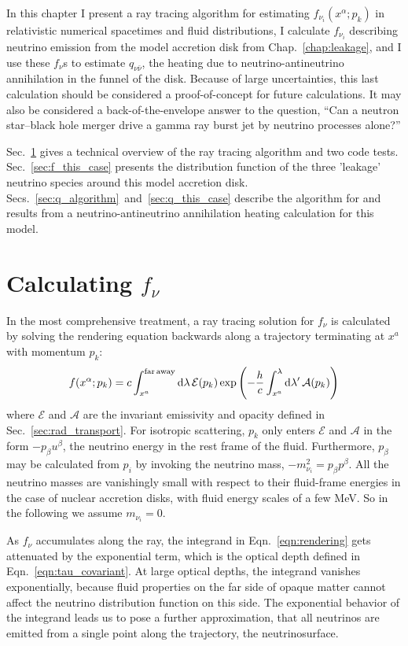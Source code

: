 In this chapter I present a ray tracing algorithm for estimating
$f_{\nu_i}(x^\alpha;p_k)$ in relativistic numerical spacetimes and fluid
distributions, I calculate $f_{\nu_i}$ describing neutrino
emission from the model accretion disk from Chap.~\ref{chap:leakage},
and I use these $f_\nu$s to estimate $q_{\nu\bar{\nu}}$, the heating due to
neutrino-antineutrino annihilation in the funnel of the disk.
Because of large uncertainties,
this last calculation should be considered a proof-of-concept for future
calculations. It may also be considered a back-of-the-envelope answer to
the question, ``Can a neutron star--black hole merger drive a gamma ray burst
jet by neutrino processes alone?''

Sec.~\ref{sec:f_algorithm} gives a technical overview of the ray tracing
algorithm and two code tests. Sec.~\ref{sec:f_this_case} presents the distribution
function of the three 'leakage' neutrino species around this model accretion
disk. Secs.~\ref{sec:q_algorithm}~and~\ref{sec:q_this_case} describe the
algorithm for and results from a neutrino-antineutrino annihilation heating
calculation for this model.

\section{Calculating $f_\nu$}
\label{sec:f_algorithm}

In the most comprehensive treatment, a ray tracing solution for $f_\nu$ is calculated
by solving the rendering equation backwards along a trajectory terminating at
$x^a$ with momentum $p_k$:
\begin{equation}
  \label{eqn:rendering}
  f(x^\alpha;p_k) = c \int_{x^a}^{\rm far\,away} \mathrm{d} \lambda \, \mathcal{E}(p_k)
  \exp\left(-\frac{h}{c}\int_{x^a}^\lambda  \mathrm{d} \lambda' \, \mathcal{A}(p_k)\right)
\end{equation}
where $\mathcal{E}$ and $\mathcal{A}$ are the invariant emissivity and opacity
defined in Sec.~\ref{sec:rad_transport}.
For isotropic scattering, $p_k$ only enters $\mathcal{E}$ and $\mathcal{A}$ in the
form $-p_\beta u^\beta$, the neutrino energy in the rest frame of the fluid.
Furthermore, $p_\beta$ may be calculated from $p_i$ by invoking the neutrino mass,
$-m_{\nu_i}^2=p_\beta p^\beta$.
All the neutrino masses are vanishingly small with respect to their fluid-frame
energies in the case of nuclear accretion disks, with fluid energy scales of a
few MeV. So in the following we assume $m_{\nu_i}=0$.

As $f_\nu$ accumulates along the ray, the integrand in Eqn.~\ref{eqn:rendering}
gets attenuated by the exponential term, which is the optical depth defined in
Eqn.~\ref{eqn:tau_covariant}.
At large optical depths, the integrand vanishes exponentially, because fluid
properties on the far side of opaque matter cannot affect the neutrino
distribution function on this side. The exponential behavior of the integrand
leads us to pose a further approximation, that all neutrinos are emitted from
a single point along the trajectory, the neutrinosurface.

